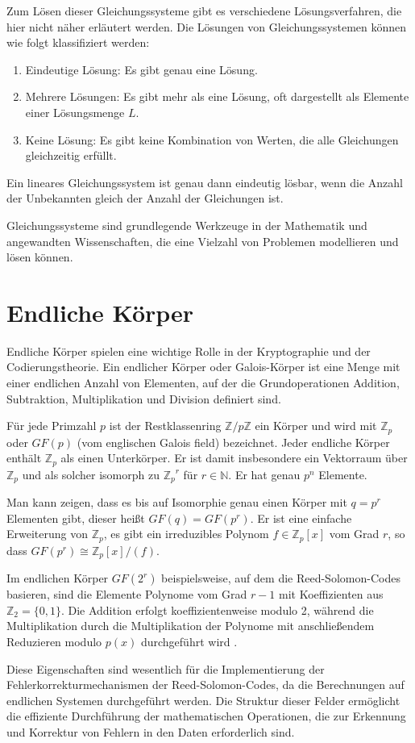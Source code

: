 Zum Lösen dieser Gleichungssysteme gibt es verschiedene Lösungsverfahren, die hier nicht näher erläutert werden.
Die Lösungen von Gleichungssystemen können wie folgt klassifiziert werden:
\begin{enumerate}[noitemsep]
	\item Eindeutige Lösung: Es gibt genau eine Lösung.
	\item Mehrere Lösungen: Es gibt mehr als eine Lösung, oft dargestellt als Elemente einer Lösungsmenge $L$.
	\item Keine Lösung: Es gibt keine Kombination von Werten, die alle Gleichungen gleichzeitig erfüllt.
\end{enumerate}
Ein lineares Gleichungssystem ist genau dann eindeutig lösbar, wenn die Anzahl der Unbekannten gleich der Anzahl der Gleichungen ist.

Gleichungssysteme sind grundlegende Werkzeuge in der Mathematik und angewandten Wissenschaften, die eine Vielzahl von Problemen modellieren und lösen können.

\section{Endliche Körper}\label{sec:galois}

Endliche Körper spielen eine wichtige Rolle in der Kryptographie und der Codierungstheorie.
Ein endlicher Körper oder Galois-Körper ist eine Menge mit einer endlichen Anzahl von Elementen, auf der die Grundoperationen Addition, Subtraktion, Multiplikation und Division definiert sind.

Für jede Primzahl $p$ ist der Restklassenring $\mathbb{Z}/p\mathbb{Z}$  ein Körper und wird mit $\mathbb{Z}_p$ oder $GF(p)$ (vom englischen Galois field) bezeichnet.
Jeder endliche Körper enthält $\mathbb{Z}_p$ als einen Unterkörper.
Er ist damit insbesondere ein Vektorraum über $\mathbb{Z}_p$ und als solcher isomorph zu ${\mathbb{Z}_p}^r$ für $r\in\mathbb{N}$.
Er hat genau $p^n$ Elemente.

Man kann zeigen, dass es bis auf Isomorphie genau einen Körper mit $q=p^r$ Elementen gibt, dieser heißt $GF(q)=GF(p^r)$.
Er ist eine einfache Erweiterung von $\mathbb{Z}_p$, \dahe es gibt ein irreduzibles Polynom $f\in\mathbb{Z}_p[x]$ vom Grad $r$, so dass $GF(p^r)\cong\mathbb{Z}_p[x]/(f)$.

Im endlichen Körper $GF(2^r)$ beispielsweise, auf dem die Reed-Solomon-Codes basieren, sind die Elemente Polynome vom Grad $r-1$ mit Koeffizienten aus $\mathbb{Z}_2=\{0,1\}$.
Die Addition erfolgt koeffizientenweise modulo 2, während die Multiplikation durch die Multiplikation der Polynome mit anschließendem Reduzieren modulo $p(x)$ durchgeführt wird \cite{schulz-hankeBCHCodesCombined2023}.

Diese Eigenschaften sind wesentlich für die Implementierung der Fehlerkorrekturmechanismen der Reed-Solomon-Codes, da die Berechnungen auf endlichen Systemen durchgeführt werden.
Die Struktur dieser Felder ermöglicht die effiziente Durchführung der mathematischen Operationen, die zur Erkennung und Korrektur von Fehlern in den Daten erforderlich sind. 
